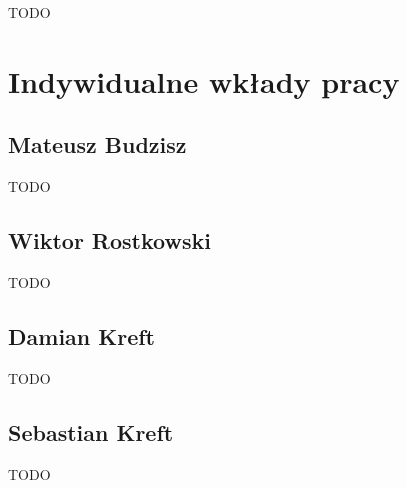 TODO

\section{Indywidualne wkłady pracy}
\label{sec:indywidualne-wklady-pracy}

\subsection{Mateusz Budzisz}
\label{subsec:mateusz-budzisz}

TODO

\subsection{Wiktor Rostkowski}
\label{subsec:wiktor-rostkowski}

TODO

\subsection{Damian Kreft}
\label{subsec:damian-kreft}

TODO

\subsection{Sebastian Kreft}
\label{subsec:sebastian-kreft}

TODO
